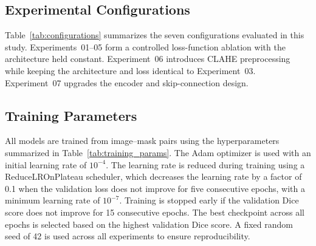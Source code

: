 \documentclass[a4paper,12pt]{article}
\begin{document}
\subsection{Experimental Configurations}
\label{sub:experimental_configurations}

Table~\ref{tab:configurations} summarizes the seven configurations evaluated in this study.
Experiments~01--05 form a controlled loss-function ablation with the architecture held constant.
Experiment~06 introduces CLAHE preprocessing while keeping the architecture and loss identical
to Experiment~03. Experiment~07 upgrades the encoder and skip-connection design.

\begin{table}[htbp]
\centering
\caption{Summary of the seven experimental configurations. All share the same U-Net/ResNet-34
architecture except Experiment~07. All use the DiceBCE loss except where noted.}
\label{tab:configurations}
\renewcommand{\arraystretch}{1.3}
\end{table}


\subsection{Training Parameters}
\label{sub:training_parameters}

All models are trained from image--mask pairs using the hyperparameters summarized in
Table~\ref{tab:training_params}. The Adam optimizer is used with an initial learning rate of
$10^{-4}$. The learning rate is reduced during training using a ReduceLROnPlateau scheduler,
which decreases the learning rate by a factor of 0.1 when the validation loss does not improve
for five consecutive epochs, with a minimum learning rate of $10^{-7}$. Training is stopped
early if the validation Dice score does not improve for 15 consecutive epochs. The best
checkpoint across all epochs is selected based on the highest validation Dice score. A fixed
random seed of 42 is used across all experiments to ensure reproducibility.
\end{document}
